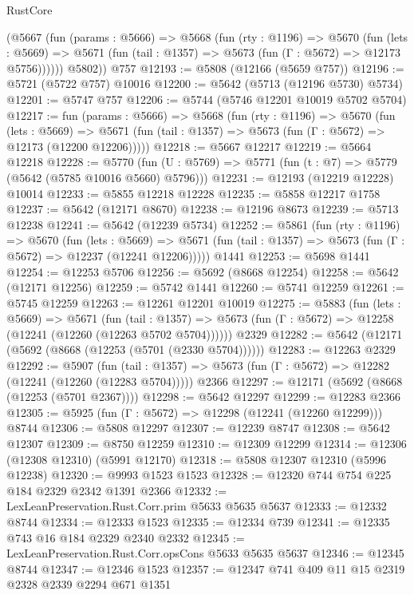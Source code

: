 \begin{lexlean}{RustCore}
\begin{coremodule}
        (@5667
          (fun (params : @5666) =>
          @5668
            (fun (rty : @1196) =>
            @5670
              (fun (lets : @5669) =>
              @5671 (fun (tail : @1357) => @5673 (fun (Γ : @5672) => @12173 @5756))))))
        @5802))
    @757
@12193 := @5808 (@12166 (@5659 @757))
@12196 := @5721 (@5722 @757) @10016
@12200 := @5642 (@5713 (@12196 @5730) @5734)
@12201 := @5747 @757
@12206 := @5744 (@5746 @12201 @10019 @5702 @5704)
@12217 := fun (params : @5666) =>
  @5668
    (fun (rty : @1196) =>
    @5670
      (fun (lets : @5669) =>
      @5671 (fun (tail : @1357) => @5673 (fun (Γ : @5672) => @12173 (@12200 @12206)))))
@12218 := @5667 @12217
@12219 := @5664 @12218
@12228 := @5770
    (fun (U : @5769) => @5771 (fun (t : @7) => @5779 (@5642 (@5785 @10016 @5660) @5796)))
@12231 := @12193 (@12219 @12228) @10014
@12233 := @5855 @12218 @12228
@12235 := @5858 @12217 @1758
@12237 := @5642 (@12171 @8670)
@12238 := @12196 @8673
@12239 := @5713 @12238
@12241 := @5642 (@12239 @5734)
@12252 := @5861
    (fun (rty : @1196) =>
    @5670
      (fun (lets : @5669) =>
      @5671 (fun (tail : @1357) => @5673 (fun (Γ : @5672) => @12237 (@12241 @12206)))))
    @1441
@12253 := @5698 @1441
@12254 := @12253 @5706
@12256 := @5692 (@8668 @12254)
@12258 := @5642 (@12171 @12256)
@12259 := @5742 @1441
@12260 := @5741 @12259
@12261 := @5745 @12259
@12263 := @12261 @12201 @10019
@12275 := @5883
    (fun (lets : @5669) =>
    @5671
      (fun (tail : @1357) =>
      @5673 (fun (Γ : @5672) => @12258 (@12241 (@12260 (@12263 @5702 @5704))))))
    @2329
@12282 := @5642 (@12171 (@5692 (@8668 (@12253 (@5701 (@2330 @5704))))))
@12283 := @12263 @2329
@12292 := @5907
    (fun (tail : @1357) => @5673 (fun (Γ : @5672) => @12282 (@12241 (@12260 (@12283 @5704)))))
    @2366
@12297 := @12171 (@5692 (@8668 (@12253 (@5701 @2367))))
@12298 := @5642 @12297
@12299 := @12283 @2366
@12305 := @5925 (fun (Γ : @5672) => @12298 (@12241 (@12260 @12299))) @8744
@12306 := @5808 @12297
@12307 := @12239 @8747
@12308 := @5642 @12307
@12309 := @8750 @12259
@12310 := @12309 @12299
@12314 := @12306 (@12308 @12310) (@5991 @12170)
@12318 := @5808 @12307 @12310 (@5996 @12238)
@12320 := @9993 @1523 @1523
@12328 := @12320 @744 @754 @225 @184 @2329 @2342 @1391 @2366
@12332 := LexLeanPreservation.Rust.Corr.prim @5633 @5635 @5637
@12333 := @12332 @8744
@12334 := @12333 @1523
@12335 := @12334 @739
@12341 := @12335 @743 @16 @184 @2329 @2340 @2332
@12345 := LexLeanPreservation.Rust.Corr.opsCons @5633 @5635 @5637
@12346 := @12345 @8744
@12347 := @12346 @1523
@12357 := @12347 @741 @409 @11 @15 @2319 @2328 @2339 @2294 @671 @1351

\end{coremodule}
\end{lexlean}
